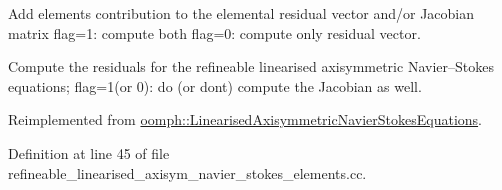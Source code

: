 Add element\textquotesingle{}s contribution to the elemental residual vector and/or Jacobian matrix flag=1\+: compute both flag=0\+: compute only residual vector. 

Compute the residuals for the refineable linearised axisymmetric Navier--Stokes equations; flag=1(or 0)\+: do (or don\textquotesingle{}t) compute the Jacobian as well. 

Reimplemented from \hyperlink{classoomph_1_1LinearisedAxisymmetricNavierStokesEquations_aeb4a4fb1574ee29efdf2bff220e65106}{oomph\+::\+Linearised\+Axisymmetric\+Navier\+Stokes\+Equations}.



Definition at line 45 of file refineable\+\_\+linearised\+\_\+axisym\+\_\+navier\+\_\+stokes\+\_\+elements.\+cc.



